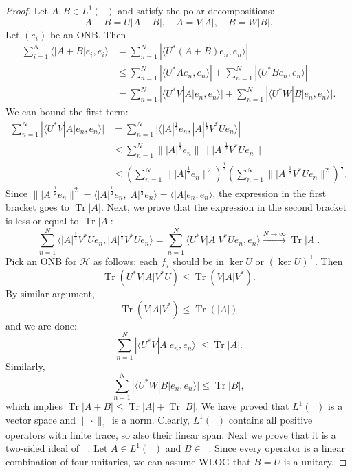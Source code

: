 \documentclass[10pt, a4paper]{article}
\newenvironment{noticeC}{%
  \tcolorbox[%
  notitle,
  empty,
  enhanced,  %
  breakable,
  coltext=black, 
  fontupper=\rmfamily,
  noparskip,
  sharp corners,
  boxrule=-1pt,  %
  frame hidden,
  left=7pt,  %
  right=7pt,
  top=5pt,
  bottom=5pt,
  before skip=2.5ex plus 2pt,
  after skip=2.5ex plus 2pt,
  overlay unbroken and last={%
  },
  ]}
{\endtcolorbox}
\newenvironment{myproof}%
  {\begin{noticeC}\begin{proof}}%
  {\end{proof}\end{noticeC}}
\DeclareMathOperator{\trace}{Tr}
\DeclareMathOperator{\bh}{\mathcal{B} (\mathcal{H})}
\begin{document}
\begin{myproof}
  Let $A, B \in L^1 (\bh)$ and satisfy the polar decompositions:
  $$A + B = U |A + B|,\quad A = V |A|,\quad B = W |B|.$$
  Let $(e_i)$ be an ONB. Then 
  \begin{align*}
    \sum_{i = 1} ^N \langle |A + B| e_i, e_i \rangle &= \sum_{n = 1} ^N |\langle U^* (A + B) e_n, e_n\rangle|\\
    &\leq \sum_{n = 1} ^N |\langle U^* A e_n, e_n \rangle| + \sum_{n = 1} ^N |\langle U^* B e_n, e_n \rangle| \\
    &= \sum_{n = 1} ^N |\langle U^* V |A| e_n, e_n \rangle| + \sum_{n = 1} ^N |\langle U^*W |B| e_n, e_n \rangle|.
  \end{align*}
  We can bound the first term:
  \begin{align*}
    \sum_{n = 1} ^N |\langle U^* V |A| e_n, e_n \rangle| &= \sum_{n = 1} ^N |\langle |A|^{\frac{1}{2}} e_n, |A|^{\frac{1}{2}} V^* U e_n \rangle|\\
    &\leq \sum_{n = 1} ^N \||A|^{\frac{1}{2}} e_n\| \||A|^{\frac{1}{2}} V^* U e_n\|\\
    &\leq \left(\sum_{n = 1} ^N \||A|^{\frac{1}{2}} e_n\|^2 \right)^{\frac{1}{2}} \left(\sum_{n = 1} ^N \||A|^{\frac{1}{2}} V^* U e_n\|^2\right)^{\frac{1}{2}}.
  \end{align*}
  Since $\| |A|^{\frac{1}{2}} e_n \|^2 = \langle |A|^{\frac{1}{2}} e_n, |A|^{\frac{1}{2}} e_n \rangle = \langle |A| e_n, e_n\rangle$, the expression in the first bracket goes to $\trace |A|$.
  Next, we prove that the expression in the second bracket is less or equal to $\trace |A|$:
  $$\sum_{n = 1} ^N \langle |A|^{\frac{1}{2}} V^* U e_n, |A|^{\frac{1}{2}} V^* U e_n \rangle = \sum_{n = 1} ^N \langle U^* V |A| V^* U e_n, e_n \rangle \xrightarrow{N \to \infty} \trace |A|.$$
  Pick an ONB for $\mathcal{H}$ as follows: each $f_j$ should be in $\ker U$ or $(\ker U)^\perp$.
  Then $$\trace (U^* V |A| V^* U) \leq \trace (V |A| V^*).$$
  By similar argument, 
  $$\trace (V |A| V^*) \leq \trace(|A|)$$
  and we are done:
  $$\sum_{n = 1} ^N |\langle U^* V |A| e_n, e_n \rangle| \leq \trace |A|.$$
  Similarly, 
  $$\sum_{n = 1} ^N |\langle U^* W |B| e_n, e_n \rangle| \leq \trace |B|,$$
  which implies 
  $\trace |A + B| \leq \trace |A| + \trace |B|$.
  We have proved that $L^1 (\bh)$ is a vector space and $\| \cdot \|_1$ is a norm.
  Clearly, $L^1 (\bh)$ contains all positive operators with finite trace,
  so also their linear span. Next we prove that it is a two-sided ideal of $\bh$.
  Let $A \in L^1 (\bh)$ and $B \in \bh$.
  Since every operator is a linear combination of four unitaries, we can assume WLOG that $B = U$ is a unitary.

\end{myproof}
\end{document}
